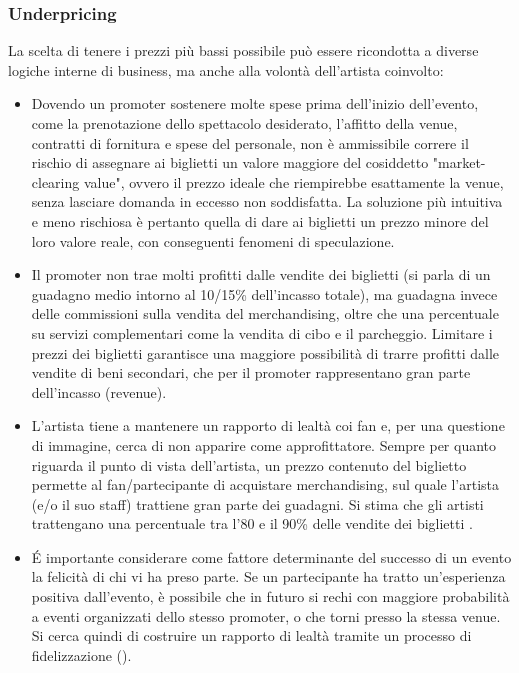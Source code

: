 \subsubsection{Underpricing}
La scelta di tenere i prezzi più bassi possibile può essere ricondotta a diverse logiche interne di business, ma anche alla volontà dell'artista coinvolto: 
\begin{itemize}
\item Dovendo un promoter sostenere molte spese prima dell'inizio dell'evento, come la prenotazione dello spettacolo desiderato, l'affitto della venue, contratti di fornitura e spese del personale, non è ammissibile correre il rischio di assegnare ai biglietti un valore maggiore del cosiddetto "market-clearing value", ovvero il prezzo ideale che riempirebbe esattamente la venue, senza lasciare domanda in eccesso non soddisfatta. La soluzione più intuitiva e meno rischiosa è pertanto quella di dare ai biglietti un prezzo minore del loro valore reale, con conseguenti fenomeni di speculazione. 
\item Il promoter non trae molti profitti dalle vendite dei biglietti (si parla di un guadagno medio intorno al 10/15\% dell'incasso totale), ma guadagna invece delle commissioni sulla vendita del merchandising, oltre che una percentuale su servizi complementari come la vendita di cibo e il parcheggio. Limitare i prezzi dei biglietti garantisce una maggiore possibilità di trarre profitti dalle vendite di beni secondari, che per il promoter rappresentano gran parte dell'incasso (revenue).
\item L'artista tiene a mantenere un rapporto di lealtà coi fan e, per una questione di immagine, cerca di non apparire come approfittatore. Sempre per quanto riguarda il punto di vista dell'artista, un prezzo contenuto del biglietto permette al fan/partecipante di acquistare merchandising, sul quale l'artista (e/o il suo staff) trattiene gran parte dei guadagni. Si stima che gli artisti trattengano una percentuale tra l'80 e il 90\% delle vendite dei biglietti \cite{phdthesis, tompkins2018ticket}. 
\item \'E importante considerare come fattore determinante del successo di un evento la felicità di chi vi ha preso parte. Se un partecipante ha tratto un'esperienza positiva dall'evento, è possibile che in futuro si rechi con maggiore probabilità a eventi organizzati dello stesso promoter, o che torni presso la stessa venue. Si cerca quindi di costruire un rapporto di lealtà tramite un processo di fidelizzazione (\cite{tompkins2018ticket}).
\end{itemize}
